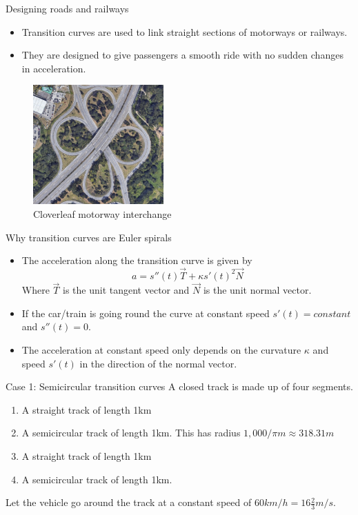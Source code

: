 \documentclass{beamer}
\begin{document}
\begin{frame}{Designing roads and railways}
	\begin{itemize}
		\item Transition curves are used to link straight sections of motorways or railways.
		\item They are designed to give passengers a smooth ride with no sudden changes in acceleration.

	\end{itemize}
		\begin{figure}
		\caption{Cloverleaf motorway interchange}
		\centering
		\includegraphics[width=50mm, scale=0.5]{cloverleaf_motorway.png}
	\end{figure}

\end{frame}

\begin{frame}{Why transition curves are Euler spirals}
	\begin{itemize}
	\item The acceleration along the transition curve is given by
 	 \[
 	 a=s''(t) \vec{T}+\kappa s'(t)^2 \vec{N}
 	 \]
 	 Where $\vec{T}$ is the unit tangent vector and $\vec{N}$ is the unit normal vector.
 	 \item If the car/train is going round the curve at constant speed $s'(t)=constant$ and $s''(t)=0$.	
 	 \item The acceleration at constant speed only depends on the curvature $\kappa$ and speed $s'(t)$ in the direction of the normal vector.
	\end{itemize}
\end{frame}

\begin{frame}{Case 1: Semicircular transition curves}
	A closed  track is made up of four segments.
	\begin{enumerate}
		\item A straight track of length 1km
		\item A semicircular track of length 1km. This has radius $1,000 / \pi m \approx 318.31m$
		\item A straight track of length 1km
		\item A semicircular track of length 1km.
	\end{enumerate}
	Let the vehicle go around the track at a constant speed of $60 km/h = 16 \frac{2}{3} m/s$.
\end{frame}
\end{document}
